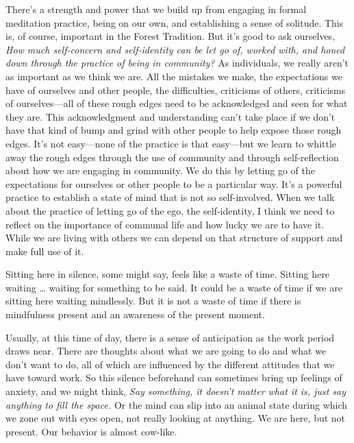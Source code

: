 There's a strength and power that we build up from engaging in formal 
meditation practice, being on our own, and establishing a sense of 
solitude. This is, of course, important in the Forest Tradition. But 
it's good to ask ourselves, \emph{How much self-concern and 
self-identity can be let go of, worked with, and honed down through the 
practice of being in community?} As individuals, we really aren't as 
important as we think we are. All the mistakes we make, the 
expectations we have of ourselves and other people, the difficulties, 
criticisms of others, criticisms of ourselves---all of these rough 
edges need to be acknowledged and seen for what they are. This 
acknowledgment and understanding can't take place if we don't have that 
kind of bump and grind with other people to help expose those rough 
edges. It's not easy---none of the practice is that easy---but we learn 
to whittle away the rough edges through the use of community and 
through self-reflection about how we are engaging in community. We do 
this by letting go of the expectations for ourselves or other people to 
be a particular way. It's a powerful practice to establish a state of 
mind that is not so self-involved. When we talk about the practice of 
letting go of the ego, the self-identity, I think we need to reflect on 
the importance of communal life and how lucky we are to have it. While 
we are living with others we can depend on that structure of support 
and make full use of it.


Sitting here in silence, some might say, feels like a waste of time. 
Sitting here waiting \ldots{} waiting for something to be said. It 
could be a waste of time if we are sitting here waiting mindlessly. But 
it is not a waste of time if there is mindfulness present and an 
awareness of the present moment.

Usually, at this time of day, there is a sense of anticipation as the 
work period draws near. There are thoughts about what we are going to 
do and what we don't want to do, all of which are influenced by the 
different attitudes that we have toward work. So this silence 
beforehand can sometimes bring up feelings of anxiety, and we might 
think, \emph{Say something, it doesn't matter what it is, just say 
anything to fill the space.} Or the mind can slip into an animal state 
during which we zone out with eyes open, not really looking at 
anything. We are here, but not present. Our behavior is almost cow-like.

